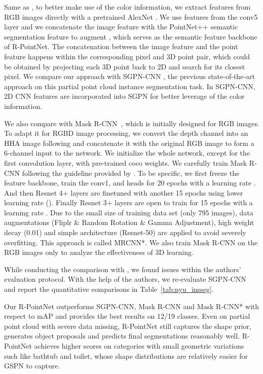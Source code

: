 \documentclass[10pt,twocolumn,letterpaper]{article}
\begin{document}
Same as \cite{wang2018sgpn}, to better make use of the color information, we extract features from RGB images directly with a pretrained AlexNet \cite{krizhevsky2012imagenet}. We use features from the conv5 layer and we concatenate the image feature with the PointNet++ semantic segmentation feature to augment , which serves as the semantic feature backbone of R-PointNet. The concatenation between the image feature and the point feature happens within the corresponding pixel and 3D point pair, which could be obtained by projecting each 3D point back to 2D and search for its closest pixel. We compare our approach with SGPN-CNN \cite{wang2018sgpn}, the previous state-of-the-art approach on this partial point cloud instance segmentation task. In SGPN-CNN, 2D CNN features are incorporated into SGPN for better leverage of the color information.

We also compare with Mask R-CNN~\cite{he2017mask}, which is initially designed for RGB images. To adapt it for RGBD image processing, we convert the depth channel into an HHA image following \cite{gupta2014learning} and concatenate it with the original RGB image to form a 6-channel input to the network. We initialize the whole network, except for the first convolution layer, with pre-trained coco weights. We carefully train Mask R-CNN following the guideline provided by \cite{maskrcnnwiki}. To be specific, we first freeze the feature backbone, train the conv1, and heads for 20 epochs with a learning rate . And then Resnet 4+ layers are finetuned with another 15 epochs using lower learning rate (). Finally Resnet 3+ layers are open to train for 15 epochs with a learning rate . Due to the small size of training data set (only 795 images), data augmentations (Fliplr \&  Random Rotation \& Gamma Adjustment), high weight decay (0.01) and simple architecture (Resnet-50) are applied to avoid severely overfitting.
This approach is called MRCNN*. We also train Mask R-CNN on the RGB images only to analyze the effectiveness of 3D learning.


While conducting the comparison with \cite{wang2018sgpn}, we found issues within the authors' evaluation protocol. With the help of the authors, we re-evaluate SGPN-CNN and report the quantitative comparisons in Table~\ref{tab:nyu_insseg}.

Our R-PointNet outperforms SGPN-CNN, Mask R-CNN and Mask R-CNN* with respect to mAP and provides the best results on 12/19 classes. Even on partial point cloud with severe data missing, R-PointNet still captures the shape prior, generates object proposals and predicts final segmentations reasonably well. R-PointNet achieves higher scores on categories with small geometric variations such like bathtub and toilet, whose shape distributions are relatively easier for GSPN to capture. 
\end{document}
